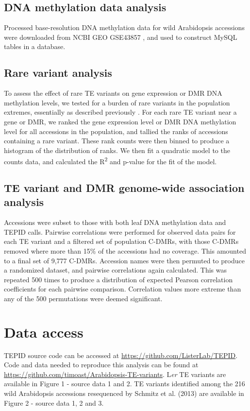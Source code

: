\documentclass[12pt]{article}
\begin{document}
\subsection{DNA methylation data analysis}

Processed base-resolution DNA methylation data for wild Arabidopsis
accessions were downloaded from NCBI GEO GSE43857 \cite{Schmitz:2013iu},
and used to construct MySQL tables in a database.

\subsection{Rare variant analysis}

To assess the effect of rare TE variants on gene expression or DMR DNA
methylation levels, we tested for a burden of rare variants in the
population extremes, essentially as described previously
\cite{Zhao:2016gc}. For each rare TE variant near a gene or DMR, we
ranked the gene expression level or DMR DNA methylation level for all
accessions in the population, and tallied the ranks of accessions
containing a rare variant. These rank counts were then binned to produce
a histogram of the distribution of ranks. We then fit a quadratic model
to the counts data, and calculated the R\textsuperscript{2} and p-value for the fit of
the model.

\subsection{TE variant and DMR genome-wide association analysis}

Accessions were subset to those with both leaf DNA methylation data and
TEPID calls. Pairwise correlations were performed for observed data
pairs for each TE variant and a filtered set of population C-DMRs, with
those C-DMRs removed where more than 15\% of the accessions had no
coverage. This amounted to a final set of 9,777 C-DMRs. Accession names
were then permuted to produce a randomized dataset, and pairwise
correlations again calculated. This was repeated 500 times to produce a
distribution of expected Pearson correlation coefficients for each
pairwise comparison. Correlation values more extreme than any of the 500
permutations were deemed significant.

\section{Data access}

TEPID source code can be accessed at
\url{https://github.com/ListerLab/TEPID}. Code and data needed to
reproduce this analysis can be found at
\url{https://github.com/timoast/Arabidopsis-TE-variants}. L\emph{er }TE
variants are available in Figure 1 - source data 1 and 2. TE variants
identified among the 216 wild Arabidopsis accessions resequenced by
Schmitz et al. (2013) are available in Figure 2 - source data 1, 2 and
3.
\end{document}
